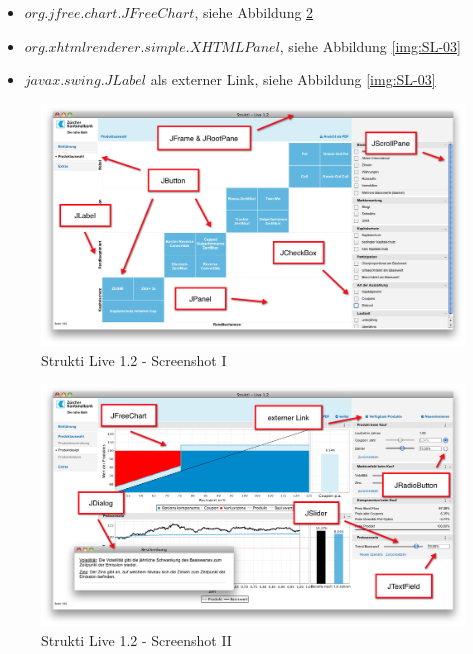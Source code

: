   \begin{itemize}
    \item \(org.jfree.chart.JFreeChart\), siehe Abbildung \ref{img:SL-02}
    \item \(org.xhtmlrenderer.simple.XHTMLPanel\), siehe Abbildung
    \ref{img:SL-03}
    \item \(javax.swing.JLabel\) als externer Link, siehe Abbildung
    \ref{img:SL-03}
  \end{itemize}
  
  \begin{figure}[htb]
    \begin{center}
      \includegraphics[width=\textwidth]{./image/SL/SL-01.png}
      \caption{Strukti Live 1.2 - Screenshot I}
      \label{img:SL-01}
    \end{center}
  \end{figure}
  
  \begin{figure}[htb]
    \begin{center}
      \includegraphics[width=\textwidth]{./image/SL/SL-02.png}
      \caption{Strukti Live 1.2 - Screenshot II}
      \label{img:SL-02}
    \end{center}
  \end{figure}
  
